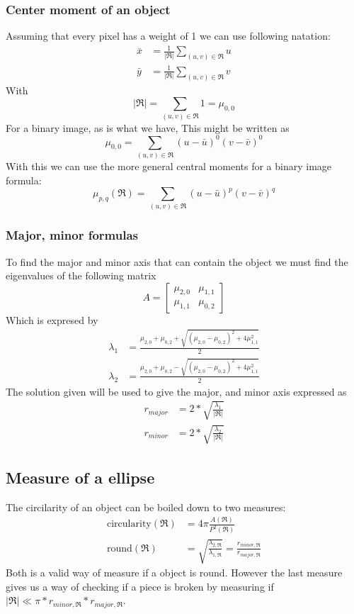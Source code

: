 \documentclass{article}
\begin{document}
\subsubsection{Center moment of an object}
Assuming that every pixel has a weight of 1 we can use following natation\cite[234]{wilhelm_burger_digital_nodate}:
\begin{align*}
\bar{x}&=\frac{1}{|\Re|}\sum_{(u,v)\in \Re} u\\
\bar{y}&=\frac{1}{|\Re|}\sum_{(u,v) \in \Re} v
\end{align*}
With
$$
|\Re| = \sum_{(u,v)\in \Re} 1 = \mu_{0,0}
$$
For a binary image, as is what we have, This might be written as 
$$
\mu_{0,0} = \sum_{(u,v)\in \Re} (u-\bar{u})^0(v-\bar{v})^0
$$
With this we can use the more general central moments for a binary image formula\cite[page. 234]{wilhelm_burger_digital_nodate}:
$$
\mu_{p,q}(\Re) = \sum_{(u,v)\in \Re} (u-\bar{u})^p(v-\bar{v})^q
$$

\subsubsection{Major, minor formulas}
To find the major and minor axis that can contain the object we must find the eigenvalues of the following matrix\cite[page.238]{wilhelm_burger_digital_nodate}
$$
A=\begin{bmatrix}
\mu_{2,0} & \mu_{1,1} \\
\mu_{1,1} & \mu_{0,2}
\end{bmatrix}
$$
Which is expresed by
\begin{align*}
\lambda_1 &= \frac{\mu_{2,0} + \mu_{0,2} + \sqrt{(\mu_{2,0}-\mu_{0,2})^2+4\mu_{1,1}^2}}{2}\\
\lambda_2 &= \frac{\mu_{2,0} + \mu_{0,2} - \sqrt{(\mu_{2,0}-\mu_{0,2})^2+4\mu_{1,1}^2}}{2}
\end{align*}
The solution given will be used to give the major, and minor axis expressed as
\begin{align*}
r_{major} &= 2*\sqrt{\frac{\lambda_1}{|\Re|}}\\
r_{minor} &= 2*\sqrt{\frac{\lambda_2}{|\Re|}}
\end{align*}

\subsection{Measure of a ellipse}\label{eq:roundness}
The circilarity of an object can be boiled down to two measures:
\begin{align*}
\text{circularity}(\Re) &= 4\pi\frac{A(\Re)}{P^2(\Re)}\\
\text{round}(\Re) &= \sqrt{\frac{\lambda_{2,\Re}}{\lambda_{1,\Re}}}=\frac{r_{minor,\Re}}{r_{major,\Re}}
\end{align*}
Both is a valid way of measure if a object is round. However the last measure gives us a way of checking if a piece is broken by measuring if $|\Re|\ll\pi *r_{minor,\Re}*r_{major,\Re}$.
\end{document}
